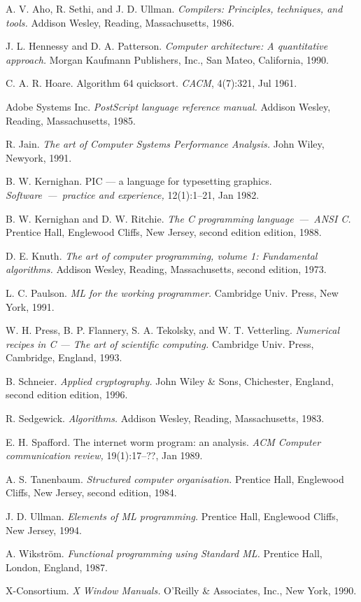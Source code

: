 \begin{thebibliography}{17}

  A. V. Aho, R. Sethi, and J. D. Ullman. \emph{Compilers: Principles, techniques, and tools.} Addison Wesley, Reading, Massachusetts, 1986.

  J. L. Hennessy and D. A. Patterson. \emph{Computer architecture: A quantitative approach.} Morgan Kaufmann Publishers, Inc., San Mateo, California, 1990.

  C. A. R. Hoare. Algorithm 64 quicksort. \emph{CACM}, 4(7):321, Jul 1961.

  Adobe Systems Inc. \emph{PostScript language reference manual.} Addison Wesley, Reading, Massachusetts, 1985.

  R. Jain. \emph{The art of Computer Systems Performance Analysis.}  John Wiley, Newyork, 1991.

  B. W. Kernighan. PIC --- a language for typesetting graphics. \emph{Software~---~practice and experience,} 12(1):1–21, Jan 1982.

  B. W. Kernighan and D. W. Ritchie. \emph{The C programming language~---~ANSI C.} Prentice Hall, Englewood Cliffs, New Jersey, second edition edition, 1988.

  D. E. Knuth. \emph{The art of computer programming, volume 1: Fundamental algorithms.} Addison Wesley, Reading, Massachusetts, second edition, 1973.

  L. C. Paulson. \emph{ML for the working programmer.} Cambridge Univ. Press, New York, 1991.

  W. H. Press, B. P. Flannery, S. A. Tekolsky, and W. T. Vetterling. \emph{Numerical recipes in C --- The art of scientific computing.} Cambridge Univ. Press, Cambridge, England, 1993.

  B. Schneier. \emph{Applied cryptography.} John Wiley \& Sons, Chichester, England, second edition edition, 1996.

  R. Sedgewick. \emph{Algorithms.} Addison Wesley, Reading, Massachusetts, 1983.

  E. H. Spafford. The internet worm program: an analysis. \emph{ACM Computer communication review,} 19(1):17–??, Jan 1989.

  A. S. Tanenbaum. \emph{Structured computer organisation.} Prentice Hall, Englewood Cliffs, New Jersey, second edition, 1984.

  J. D. Ullman. \emph{Elements of ML programming.} Prentice Hall, Englewood Cliffs, New Jersey, 1994.

  A. Wikstr\"om. \emph{Functional programming using Standard ML.} Prentice Hall, London, England, 1987.

  X-Consortium. \emph{X Window Manuals.} O’Reilly \& Associates, Inc., New York, 1990.

\end{thebibliography}
